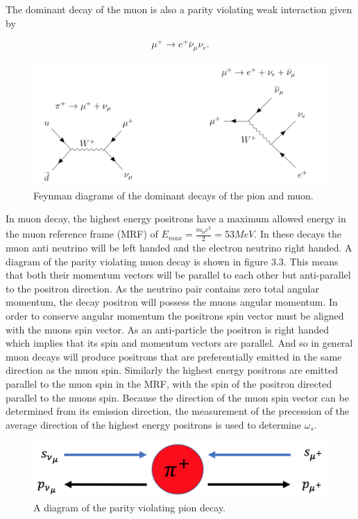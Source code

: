 The dominant decay of the muon is also a parity violating weak interaction given by

\begin{equation}
{\mu^{+}}\rightarrow{e^{+}}\bar{\nu}{_\mu}\nu{_e}.
\end{equation}

\begin{figure}[th]
\centering
\includegraphics[scale=0.8]{Figures/muonpiondecay}
\decoRule
\caption{Feynman diagrams of the dominant decays of the pion and muon.}
\label{fig:muonpiondecay}
\end{figure}

In muon decay, the highest energy positrons have a maximum allowed energy in the muon reference frame (MRF) of $E_{max}=\frac{m_{\mu}c^2}{2}=53MeV$. In these decays the muon anti neutrino will be left handed and the electron neutrino right handed. A diagram of the parity violating muon decay is shown in figure 3.3. This means that both their momentum vectors will be parallel to each other but anti-parallel to the positron direction. As the neutrino pair contains zero total angular momentum, the decay positron will possess the muons angular momentum. In order to conserve angular momentum the positrons spin vector must be aligned with the muons spin vector. As an anti-particle the positron is right handed which implies that its spin and momentum vectors are parallel. And so in general muon decays will produce positrons that are preferentially emitted in the same direction as the muon spin. Similarly the highest energy positrons are emitted parallel to the muon spin in the MRF, with the spin of the positron directed parallel to the muons spin. Because the direction of the muon spin vector can be determined from its emission direction, the measurement of the precession of the average direction of the highest energy positrons is used to determine $\omega_{s}$.

\begin{figure}[th]
\centering
\includegraphics[scale=0.8]{Figures/piondecay.png}
\decoRule
\caption{A diagram of the parity violating pion decay.}
\label{fig:piondecay}
\end{figure}

